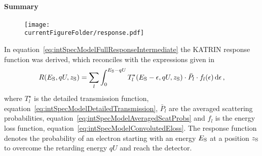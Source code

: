 \paragraph{Summary}
\begin{figure}
	\centering
	\texttt{[image: \\currentFigureFolder/response.pdf]}
	\label{fig:intSpecModelResponse}
\end{figure}
In equation~\ref{eq:intSpecModelFullResponseIntermediate} the KATRIN response function was derived, which reconciles with the expressions given in~\cite{Groh2015,Kleesiek2019}
\begin{equation}
\label{eq:intSpecModelResponse}
R(E_\mathrm{S}, qU, z_\mathrm{S}) =
\sum_{l}
	\int_{0}^{E_\mathrm{S}-qU}
		T_l^{\star}(E_\mathrm{S}-\epsilon,qU,z_\mathrm{S})
		\cdot \bar{P}_l \cdot f_l(\epsilon)
	\mathop{}\!\mathrm{d} \epsilon
\text{\,,}
\end{equation}
where $T_l^{\star}$ is the detailed transmission function, equation~\eqref{eq:intSpecModelDetailedTransmission}, $\bar{P}_l$ are the averaged scattering probabilities, equation~\eqref{eq:intSpecModelAveragedScatProbs} and $f_l$ is the energy loss function, equation~\eqref{eq:intSpecModelConvolutedEloss}. The response function denotes the probability of an electron starting with an energy $E_\mathrm{S}$ at a position $z_\mathrm{S}$ to overcome the retarding energy $qU$ and reach the detector. 

